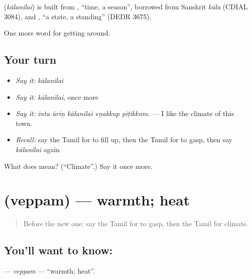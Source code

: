 \begin{cousinweb}
\textbf{} (\emph{kālanilai}) is built from , \textquotedblleft{}time, a season\textquotedblright{}, borrowed from Sanskrit \emph{kāla} (CDIAL 3084), and , \textquotedblleft{}a state, a standing\textquotedblright{} (DEDR 3675).
\end{cousinweb}

\begin{grammarlens}[title={What you've built}]
One more word for getting around.
\end{grammarlens}

\subsection*{Your turn}
\begin{itemize}
\raggedright
  \item \emph{Say it:} \emph{kālanilai}
  \item \emph{Say it:} \emph{kālanilai}, once more
  \item \emph{Say it:} \emph{inta ūriṉ kālanilai eṉakkup piṭikkum.} — I like the climate of this town.
  \item \emph{Recall:} say the Tamil for to fill up, then the Tamil for to gasp, then say \emph{kālanilai} again
\end{itemize}

\begin{tcolorbox}[breakable,colback=teal!4,colframe=teal!35!black,title={Before you move on}]
What does  mean? (\textquotedblleft{}Climate\textquotedblright{}.) Say it once more.
\end{tcolorbox}
\section[\texorpdfstring{\ta{வெப்பம்} (veppam)}{வெப்பம் (veppam)}]{ (veppam) — warmth; heat}

\label{lesson:TA-C427-veppam}



\begin{quote}
Before the new one: say the Tamil for to gasp, then the Tamil for climate.
\end{quote}

\subsection*{You'll want to know: }
\textbf{} — \emph{veppam} — \textquotedblleft{}warmth; heat\textquotedblright{}.

